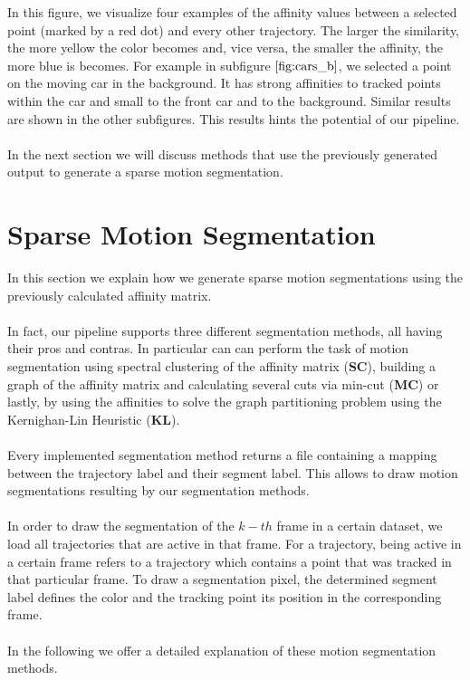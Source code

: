 In this figure, we visualize four examples of the affinity values between a selected point (marked by a red dot) and every other trajectory. The larger the similarity, the more yellow the color becomes and, vice versa,  the smaller the affinity, the more blue is becomes. For example in subfigure $\ref{fig:cars_b}$, we selected a point on the moving car in the background. It has strong affinities to tracked points within the car and small to the front car and to the background. Similar results are shown in the other subfigures. This results hints the potential of our pipeline. \\ \\
In the next section we will discuss methods that use the previously generated output to generate a sparse motion segmentation.

\section{Sparse Motion Segmentation}
\label{sec:sparse_motion_segmentation}
In this section we explain how we generate sparse motion segmentations using the previously calculated affinity matrix. \\ \\
In fact, our pipeline supports three different segmentation methods, all having their pros and contras. In particular can can perform the task of motion segmentation using spectral clustering of the affinity matrix (\textbf{SC}), building a graph of the affinity matrix and calculating several cuts via min-cut (\textbf{MC}) or lastly, by using the affinities to solve the graph partitioning problem using the Kernighan-Lin Heuristic (\textbf{KL}). \\ \\
Every implemented segmentation method returns a file containing a mapping between the trajectory label and their segment label. This allows to draw motion segmentations resulting by our segmentation methods. \\ \\
In order to draw the segmentation of the $k-th$ frame in a certain dataset, we load all trajectories that are active in that frame. For a trajectory, being active in a certain frame refers to a trajectory which contains a point that was tracked in that particular frame. To draw a segmentation pixel, the determined segment label defines the color and the tracking point its position in the corresponding frame. \\ \\
In the following we offer a detailed explanation of these motion segmentation methods.
